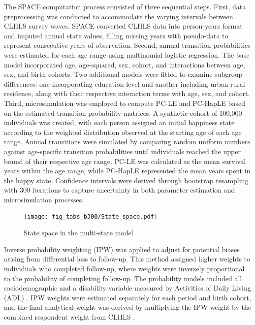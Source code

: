 \documentclass[12pt, a4paper]{article}
\begin{document}
The SPACE computation process consisted of three sequential steps. First, data preprocessing was conducted to accommodate the varying intervals between CLHLS survey waves. SPACE converted CLHLS data into person-years format and imputed annual state values, filling missing years with pseudo-data to represent consecutive years of observation. Second, annual transition probabilities were estimated for each age range using multinomial logistic regression. The base model incorporated age, age-squared, sex, cohort, and interactions between age, sex, and birth cohorts. Two additional models were fitted to examine subgroup differences: one incorporating education level and another including urban-rural residence, along with their respective interaction terms with age, sex, and cohort. Third, microsimulation was employed to compute PC-LE and PC-HapLE based on the estimated transition probability matrices. A synthetic cohort of 100,000 individuals was created, with each person assigned an initial happiness state according to the weighted distribution observed at the starting age of each age range. Annual transitions were simulated by comparing random uniform numbers against age-specific transition probabilities until individuals reached the upper bound of their respective age range. PC-LE was calculated as the mean survival years within the age range, while PC-HapLE represented the mean years spent in the happy state. Confidence intervals were derived through bootstrap resampling with 300 iterations to capture uncertainty in both parameter estimation and microsimulation processes.

\begin{figure}[htbp]
  \centering
  \texttt{[image: fig\_tabs\_b300/State\_space.pdf]}
  \caption{State space in the multi-state model}
  \label{fig:State_space}
\end{figure}

Inverse probability weighting (IPW) was applied to adjust for potential biases arising from differential loss to follow-up. This method assigned higher weights to individuals who completed follow-up, where weights were inversely proportional to the probability of completing follow-up. The probability models included all sociodemographic and a disability variable measured by Activities of Daily Living (ADL) \autocite{payne.2022.expansion,liu.2019.are,shen.2023.disability}. IPW weights were estimated separately for each period and birth cohort, and the final analytical weight was derived by multiplying the IPW weight by the combined respondent weight from CLHLS \autocite{dugoff.2014.generalizing,liu.2019.are}.
\end{document}
